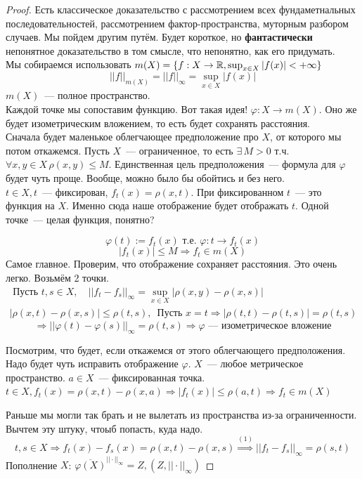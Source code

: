 \documentclass[document]{subfiles}
\begin{document}
\begin{proof}
    Есть классическое доказательство с рассмотрением всех фундаметнальных последовательностей, рассмотрением фактор-пространства, 
    муторным разбором случаев. Мы пойдем другим путём. 
    Будет короткое, но \textbf{фантастически}
    непонятное доказательство в том смысле, что непонятно, как его придумать. \\
    Мы собираемся использовать $m(X) = \{ f: X \rightarrow \mathbb{R}, \sup_{x \in X} |f(x)| < + \infty \} $
    \[ ||f||_{m(X)} = ||f||_\infty = \sup_{x \in X} |f(x)| \]
    $m(X)$~--- полное пространство. \\
    Каждой точке мы сопоставим функцию. Вот такая идея!
    $\varphi: X \rightarrow m(X)$.
    Оно же будет изометрическим вложением, то есть будет сохранять расстояния.  \\
    Сначала будет маленькое облегчающее предположение про $X$, от которого мы потом откажемся.
    Пусть $X$~--- ограниченное, то есть $\exists \, M > 0$ т.ч. $\forall x,y \in X \, \rho(x,y) \leq M$.
    Единственная цель предположения~--- формула для $\varphi$ будет чуть проще. Вообще, можно было бы обойтись и без него. \\
    $t \in X, t$~--- фиксирован, $f_t(x) = \rho(x,t)$.
    При фиксированном $t$~--- это функция на $X$. Именно сюда наше отображение будет отображать $t$. Одной точке~--- целая функция, понятно?

    \[ \varphi(t) := f_t(x) \text{ т.е. } \varphi: t \rightarrow f_t(x) \]
    \[ |f_t(x)| \leq M \Rightarrow f_t \in m(X) \]
    Самое главное. Проверим, что отображение сохраняет расстояния. Это очень легко. Возьмём 2 точки.
    \begin{gather*}
        \text{ Пусть } t, s \in X, \quad ||f_t - f_s||_\infty = \sup_{x \in X} |\rho(x,y) - \rho(x,s)|\\
        |\rho(x,t) - \rho(x,s) | \leq \rho(t,s), \, \text { Пусть } x = t \Rightarrow |\rho(t,t) - \rho(t,s) | = \rho(t,s)
    \end{gather*}
    \[ \Rightarrow  || \varphi(t) - \varphi(s)||_\infty = \rho(t,s) \Rightarrow \varphi \text{~--- изометрическое вложение} \]

    Посмотрим, что будет, если откажемся от этого облегчающего предположения. Надо будет чуть исправить отображение $\varphi$.
    $X$~--- любое метрическое пространство. $a \in X$~--- фиксированная точка.\\
    $t \in X, f_t(x) = \rho(x,t) - \rho(x,a) \Rightarrow |f_t(x)| \leq \rho(a,t) \Rightarrow f_t \in m(X) $

    Раньше мы могли так брать и не вылетать из пространства из-за ограниченности. Вычтем эту штуку, чтоыб попасть, куда надо. \\
    \[ t,s \in X \Rightarrow f_t(x) - f_s(x) = \rho(x,t) - \rho(x,s) \stackrel{(1)}{\Rightarrow} 
        ||f_t - f_s||_\infty = \rho(s,t) 
        \]
    Пополнение $X$: $ \overline{\varphi(X)}^{|| \cdot ||_\infty} = Z, (Z, || \cdot ||_\infty) $
\end{proof}
\end{document}
